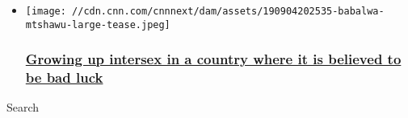 \begin{itemize}
\item
  \href{/2019/09/21/health/intersex-south-africa-intl/index.html}{}

  \texttt{[image: //cdn.cnn.com/cnnnext/dam/assets/190904202535-babalwa-mtshawu-large-tease.jpeg]}

  \hypertarget{growing-up-intersex-in-a-country-where-it-is-believed-to-be-bad-luck}{%
  \subsubsection{\texorpdfstring{\href{/2019/09/21/health/intersex-south-africa-intl/index.html}{Growing
  up intersex in a country where it is believed to be bad
  luck}}{Growing up intersex in a country where it is believed to be bad luck}}\label{growing-up-intersex-in-a-country-where-it-is-believed-to-be-bad-luck}}
\end{itemize}

Search

